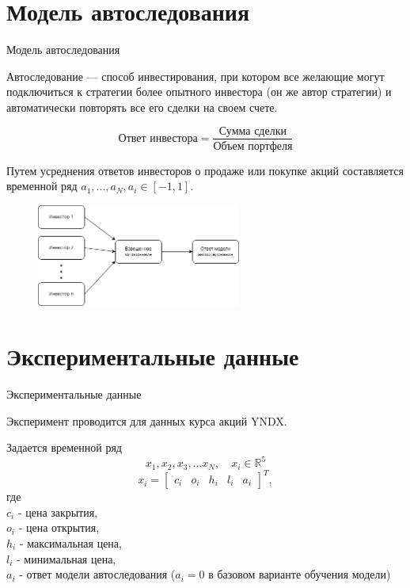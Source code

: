\documentclass[10pt,pdf,hyperref={unicode}]{beamer}
\begin{document}
\section{Модель автоследования}
\begin{frame}{Модель автоследования}

Автоследование --- способ инвестирования, при котором все желающие могут подключиться к стратегии более опытного инвестора (он же автор стратегии) и автоматически повторять все его сделки на своем счете. 

\[\text{Ответ инвестора} = \frac{\text{Сумма сделки}}{\text{Объем портфеля}}\]

Путем усреднения ответов инвесторов о продаже или покупке акций составляется временной ряд $a_{1}, ..., a_{N}, a_{i} \in [-1, 1]$.

\begin{figure}[h!t]\center
{\includegraphics[width=0.6\textwidth]{results/voting.png}}
\end{figure}

\end{frame}

\section{Экспериментальные данные}
\begin{frame}{Экспериментальные данные}

Эксперимент проводится для данных курса акций YNDX.

Задается временной ряд 
$$x_{1}, x_{2}, x_{3}, ... x_{N}, \quad x_{i} \in \mathbb{R}^{5}$$
$$
    x_{i} = 
    \begin{bmatrix}
        c_{i} & o_{i} & h_{i} & l_{i} & a_{i}
    \end{bmatrix}^{T},
$$
где \\
$c_{i}$ - цена закрытия, \\
$o_{i}$ - цена открытия, \\
$h_{i}$ - максимальная цена, \\
$l_{i}$ - минимальная цена, \\
$a_{i}$ - ответ модели автоследования ($a_{i} = 0$ в базовом варианте обучения модели)

\end{frame}
\end{document}
